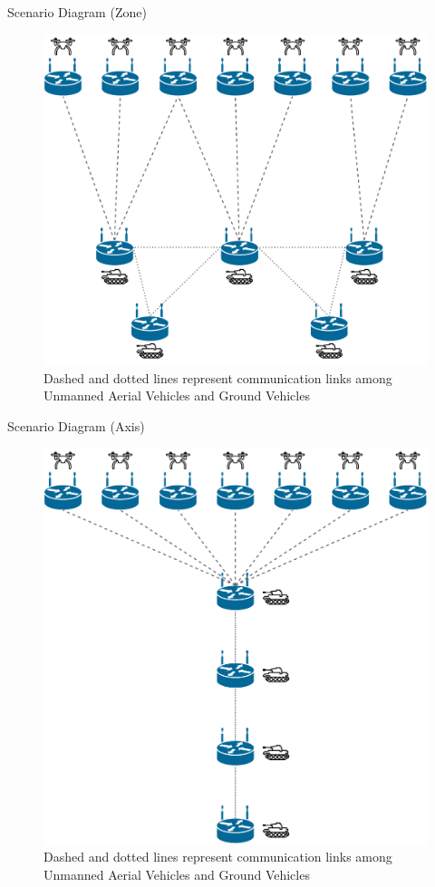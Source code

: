 \documentclass{beamer}
\begin{document}
\begin{frame}{Scenario Diagram (Zone)}
	\begin{figure}
	\includegraphics[scale=0.2]{images/forcas_armadas_2.pdf}
    \tiny
	\caption{Dashed and dotted lines represent communication links among Unmanned Aerial Vehicles and Ground Vehicles}
	\end{figure}
\end{frame}

\begin{frame}{Scenario Diagram (Axis)}
    \begin{figure}
        \includegraphics[scale=0.2]{images/forcas_armadas_1.pdf}
        \tiny
        \caption{Dashed and dotted lines represent communication links among Unmanned Aerial Vehicles and Ground Vehicles}
    \end{figure}
\end{frame}
\end{document}
